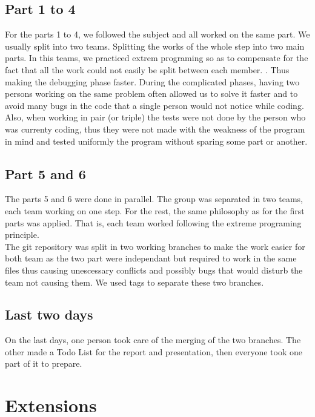 \documentclass[a4paper,10pt]{article}
\begin{document}
\subsection{Part 1 to 4}

For the parts 1 to 4, we followed the subject and all worked on the same part. We usually split into two teams.
Splitting the works of the whole step into two main parts. In this teams, we practiced extrem programing so as to
compensate for the fact that all the work could not easily be split between each member. . Thus making the debugging phase faster. During the complicated phases,
having two persons working on the same problem often allowed us to solve it faster and to avoid many bugs in the code
that a single person would not notice while coding.\\
Also, when working in pair (or triple) the tests were not done by the person who was currenty coding, thus they 
were not made with the weakness of the program in mind and tested uniformly the program without sparing some part 
or another.

\subsection{Part 5 and 6}

The parts 5 and 6 were done in parallel. The group was separated in two teams, each team working on one step.
For the rest, the same philosophy as for the first parts was applied. That is, each team worked following the
extreme programing principle.\\
The git repository was split in two working branches to make the work easier for both team as the two part were
independant but required to work in the same files thus causing unescessary conflicts and possibly bugs that would
disturb the team not causing them. We used tags to separate these two branches.

\subsection{Last two days}

On the last days, one person took care of the merging of the two branches. The other made a Todo List for the report 
and presentation, then everyone took one part of it to prepare. 

\section{Extensions}
\end{document}
